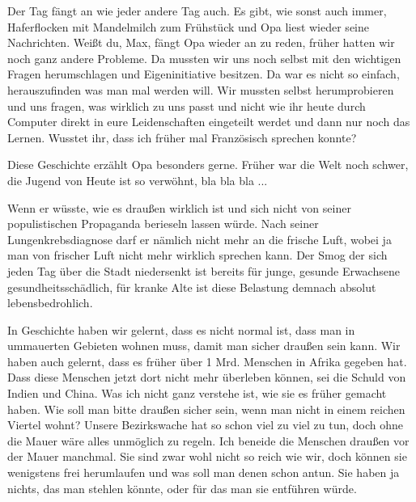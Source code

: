 \documentclass[twoside, a4paper, DIV=11, open=any, bibliography=totoc]{scrbook}
\newcommand{\Quote}[1]{\glqq #1\grqq{}}
\begin{document}
Der Tag fängt an wie jeder andere Tag auch. Es gibt, wie sonst auch immer,
Haferflocken mit Mandelmilch zum Frühstück und Opa liest wieder
seine Nachrichten. \Quote{Weißt du, Max}, fängt Opa wieder an zu reden, 
\Quote{früher hatten
wir noch ganz andere
Probleme. Da mussten wir uns noch selbst mit den wichtigen Fragen herumschlagen und
Eigeninitiative besitzen.
Da war es nicht so einfach, herauszufinden was man mal werden will. Wir mussten
selbst herumprobieren und
uns fragen, was wirklich zu uns passt und nicht wie ihr heute durch Computer direkt
in eure Leidenschaften
eingeteilt werdet und dann nur noch das Lernen. Wusstet ihr, dass ich früher mal
Französisch sprechen konnte?}

Diese Geschichte erzählt Opa besonders gerne.
\Quote{Früher war die Welt noch schwer, die
Jugend von Heute ist so
verwöhnt, bla bla bla ...}

Wenn er wüsste, wie es draußen wirklich ist und sich nicht von seiner
populistischen Propaganda berieseln lassen würde.
Nach seiner Lungenkrebsdiagnose darf er nämlich nicht mehr an die frische Luft,
wobei ja man von frischer Luft nicht mehr wirklich sprechen kann.
Der Smog der sich jeden Tag über die Stadt niedersenkt ist bereits für
junge, gesunde Erwachsene gesundheitsschädlich, für kranke Alte ist diese
Belastung demnach absolut lebensbedrohlich.

In Geschichte haben wir gelernt, dass es nicht normal ist, dass man in ummauerten
Gebieten wohnen muss, damit
man sicher draußen sein kann. Wir haben auch gelernt, dass es früher über 1 Mrd.
Menschen in Afrika gegeben hat.
Dass diese Menschen jetzt dort nicht mehr überleben können, sei die Schuld von
Indien und China.
Was ich nicht ganz
verstehe ist, wie sie es früher gemacht haben. Wie soll man bitte draußen sicher
sein, wenn man nicht in einem
reichen Viertel wohnt? Unsere Bezirkswache hat so schon viel zu viel zu tun, doch
ohne die Mauer wäre alles
unmöglich zu regeln. Ich beneide die Menschen draußen vor der Mauer manchmal.
Sie sind zwar wohl nicht so reich wie wir, doch können sie wenigstens frei
herumlaufen und was soll
man denen schon antun. Sie haben ja nichts, das man stehlen könnte, oder für das
man sie entführen würde.
\end{document}
